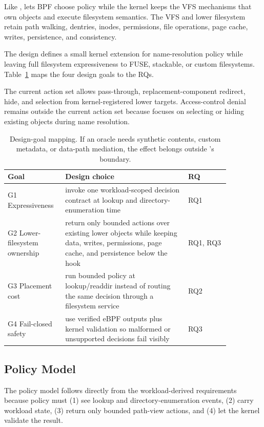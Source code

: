 Like , \namei lets BPF choose policy while the kernel keeps the
VFS mechanisms that own objects and execute filesystem semantics. The VFS and
lower filesystem retain path walking, dentries, inodes, permissions, file
operations, page cache, writes, persistence, and consistency.

The design defines a small kernel extension for name-resolution policy while
leaving full filesystem expressiveness to FUSE, stackable, or custom
filesystems. Table~\ref{tab:req-design} maps the four design goals to the RQs.

The current action set allows pass-through, replacement-component redirect,
hide, and selection from kernel-registered lower targets. Access-control denial
remains outside the current action set because \namei focuses on selecting or
hiding existing objects during name resolution.

\begin{table}[t]
\centering
\scriptsize
\begin{tabular}{@{}p{0.19\linewidth}p{0.5\linewidth}p{0.17\linewidth}@{}}
\hline
Goal & Design choice & RQ \\
\hline
G1 Expressiveness & invoke one workload-scoped decision contract at lookup and directory-enumeration time & RQ1 \\
G2 Lower-filesystem ownership & return only bounded actions over existing lower objects while keeping data, writes, permissions, page cache, and persistence below the hook & RQ1, RQ3 \\
G3 Placement cost & run bounded policy at lookup/readdir instead of routing the same decision through a filesystem service & RQ2 \\
G4 Fail-closed safety & use verified eBPF outputs plus kernel validation so malformed or unsupported decisions fail visibly & RQ3 \\
\hline
\end{tabular}
\caption{Design-goal mapping. If an oracle needs synthetic contents, custom
metadata, or data-path mediation, the effect belongs outside \namei's
boundary.}
\label{tab:req-design}
\end{table}

\subsection{Policy Model}

The policy model follows directly from the workload-derived requirements
because policy must (1) see lookup and directory-enumeration events, (2) carry
workload state, (3) return only bounded path-view actions, and (4) let the
kernel validate the result.

